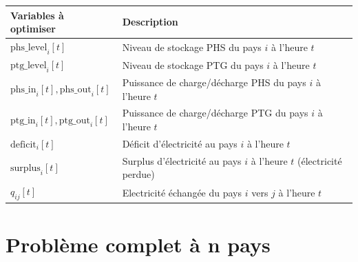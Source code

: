 \documentclass[12pt,a4paper]{article}
\begin{document}
\begin{table}[H]
\centering
\vspace{0.2 cm}
\begin{tabularx}{\textwidth}{lX}
\toprule
\textbf{Variables à optimiser} & \textbf{Description} \\
\midrule
$\mathrm{phs\_level}_i[t]$ & Niveau de stockage PHS du pays $i$ à l'heure $t$ \\
\addlinespace
$\mathrm{ptg\_level}_i[t]$ & Niveau de stockage PTG du pays $i$ à l'heure $t$ \\
\addlinespace
$\mathrm{phs\_in}_i[t], \mathrm{phs\_out}_i[t]$ & Puissance de charge/décharge PHS du pays $i$ à l'heure $t$ \\
\addlinespace
$\mathrm{ptg\_in}_i[t], \mathrm{ptg\_out}_i[t]$ & Puissance de charge/décharge PTG du pays $i$ à l'heure $t$ \\
\addlinespace
$\mathrm{deficit}_i[t]$ & Déficit d'électricité au pays $i$ à l'heure $t$ \\
\addlinespace
$\mathrm{surplus}_i[t]$ & Surplus d'électricité au pays $i$ à l'heure $t$ (électricité perdue) \\
\addlinespace
$q_{ij}[t]$ & Electricité échangée du pays $i$ vers $j$ à l'heure $t$ \\
\bottomrule
\end{tabularx}
\end{table}

\newpage
\section{Problème complet à n pays}
\end{document}
